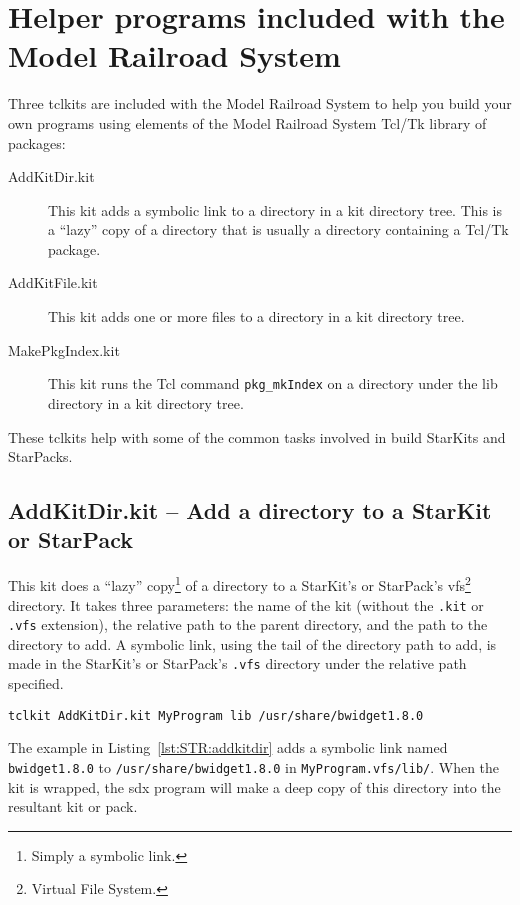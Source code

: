 \section{Helper programs included with the Model Railroad System}

Three tclkits are included with the Model Railroad System to help you
build your own programs using elements of the Model Railroad System
Tcl/Tk library of packages:
\begin{description}
\item[AddKitDir.kit] This kit adds a symbolic link to a directory in a
kit directory tree.  This is a ``lazy'' copy of a directory that is usually a
directory containing a Tcl/Tk package.
\item[AddKitFile.kit] This kit adds one or more files to a directory in
a kit directory tree.
\item[MakePkgIndex.kit] This kit runs the Tcl command
\lstinline=pkg_mkIndex= on a directory under the lib directory in a kit
directory tree.
\end{description}
These tclkits help with some of the common tasks involved in build
StarKits and StarPacks.

\subsection{AddKitDir.kit -- Add a directory to a StarKit or StarPack}

This kit does a ``lazy'' copy\footnote{Simply a symbolic link.} of a
directory to a StarKit's or StarPack's vfs\footnote{Virtual File System.}
directory.  It takes three parameters: the name of the kit (without the
\lstinline=.kit= or \lstinline=.vfs= extension), the relative path to
the parent directory, and the path to the directory to add.  A symbolic link,
using the tail of the directory path to add, is made in the StarKit's or
StarPack's \lstinline=.vfs= directory under the relative path specified.

\begin{lstlisting}[label={lst:STR:addkitdir},caption={Adding a directory
to a kit.}]
tclkit AddKitDir.kit MyProgram lib /usr/share/bwidget1.8.0
\end{lstlisting}

The example in Listing~\ref{lst:STR:addkitdir} adds a symbolic link
named \lstinline=bwidget1.8.0= to \lstinline=/usr/share/bwidget1.8.0= in
\lstinline=MyProgram.vfs/lib/=. When the kit is wrapped, the sdx program
will make a deep copy of this directory into the resultant kit or pack.

